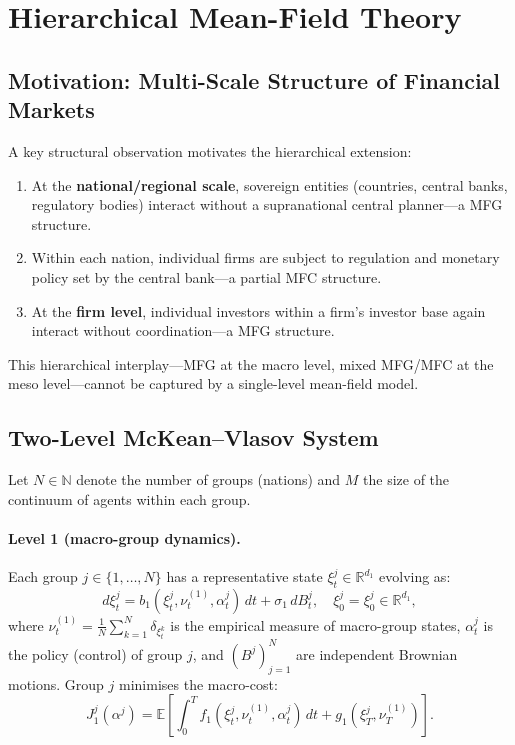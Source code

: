 \documentclass[12pt,a4paper]{article}
\theoremstyle{plain}
\theoremstyle{definition}
\newcommand{\R}{\mathbb{R}}
\newcommand{\N}{\mathbb{N}}
\newcommand{\E}{\mathbb{E}}
\newcommand{\1}{\mathbbm{1}}
\begin{document}
\section{Hierarchical Mean-Field Theory}
\label{sec:mfg}

\subsection{Motivation: Multi-Scale Structure of Financial Markets}

A key structural observation motivates the hierarchical extension:

\begin{enumerate}
\item At the \textbf{national/regional scale}, sovereign entities (countries,
  central banks, regulatory bodies) interact without a supranational central
  planner—a MFG structure.
\item Within each nation, individual firms are subject to regulation and
  monetary policy set by the central bank—a partial MFC structure.
\item At the \textbf{firm level}, individual investors within a firm's investor
  base again interact without coordination—a MFG structure.
\end{enumerate}

This hierarchical interplay—MFG at the macro level, mixed MFG/MFC at the
meso level—cannot be captured by a single-level mean-field model.

\subsection{Two-Level McKean--Vlasov System}

Let $N \in \N$ denote the number of groups (nations) and $M$ the size of the
continuum of agents within each group.

\paragraph{Level 1 (macro-group dynamics).}
Each group $j \in \{1,\ldots,N\}$ has a representative state
$\xi^j_t \in \R^{d_1}$ evolving as:
\begin{equation}
\label{eq:level1_sde}
d\xi^j_t = b_1(\xi^j_t, \nu^{(1)}_t, \alpha^j_t)\,dt + \sigma_1\,dB^j_t,
\quad \xi^j_0 = \xi^j_0 \in \R^{d_1},
\end{equation}
where $\nu^{(1)}_t = \frac{1}{N}\sum_{k=1}^N \delta_{\xi^k_t}$ is the
empirical measure of macro-group states, $\alpha^j_t$ is the policy
(control) of group $j$, and $(B^j)_{j=1}^N$ are independent Brownian motions.
Group $j$ minimises the macro-cost:
\begin{equation}
\label{eq:level1_cost}
J_1^j(\alpha^j) = \E\!\left[\int_0^T f_1(\xi^j_t, \nu^{(1)}_t, \alpha^j_t)\,dt
                             + g_1(\xi^j_T, \nu^{(1)}_T)\right].
\end{equation}
\end{document}

